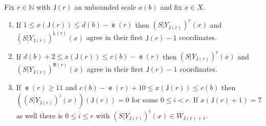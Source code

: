 \documentclass[AHL,Unicode,longabstracts,published]{cedram}
\DeclareMathOperator{\lst}{\mathsf{e}}
\newcommand{\N}{\mathbb{N}}
\newcommand{\lft}{\mathsf{L}}
\newcommand{\rht}{\mathsf{R}}
\newcommand{\scl}{\mathsf{J}}
\begin{document}
\begin{lemm}\label{lem:reduction positive}
Fix $r \in \N$ with $\scl(r)$ an unbounded scale $a(b)$ and fix $x \in X$.
\begin{enumerate}
\item\label{lem:pos red S left}
If $1 \le x(\scl(r)) \le d(b) - \lst(r)$ then $(S|Y_{\scl(r)})^r(x)$ and $(S|Y_{\scl(r)})^{\lft(r)}(x)$ agree in their first $\scl(r)-1$ coordinates.
\item\label{lem:pos red S right}
If $d(b) + 2 \le x(\scl(r)) \le c(b) - \lst(r)$ then $(S|Y_{\scl(r)})^r(x)$ and $(S|Y_{\scl(r)})^{\rht(r)}(x)$ agree in their first $\scl(r)-1$ coordinates.
\item\label{lem:pos red S bdd}
If $\lst(r) \ge 11$ and $c(b) - \lst(r) + 10 \le x(\scl(r)) \le c(b)$ then $((S|Y_{\scl(r)})^i (x))(\scl(r)) = 0$ for some $0 \le i < r$. If $x(\scl(r)+1) = 7$ as well there is $0 \le i \le r$ with $(S|Y_{\scl(r)})^i(x) \in W_{\scl(r)+1}$.
\end{enumerate}
\end{lemm}
\end{document}
